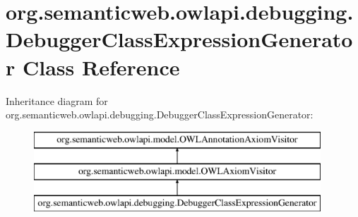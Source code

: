 \hypertarget{classorg_1_1semanticweb_1_1owlapi_1_1debugging_1_1_debugger_class_expression_generator}{\section{org.\-semanticweb.\-owlapi.\-debugging.\-Debugger\-Class\-Expression\-Generator Class Reference}
\label{classorg_1_1semanticweb_1_1owlapi_1_1debugging_1_1_debugger_class_expression_generator}
}
Inheritance diagram for org.\-semanticweb.\-owlapi.\-debugging.\-Debugger\-Class\-Expression\-Generator\-:\begin{figure}[H]
\begin{center}
\leavevmode
\includegraphics[height=3.000000cm]{classorg_1_1semanticweb_1_1owlapi_1_1debugging_1_1_debugger_class_expression_generator}
\end{center}
\end{figure}
